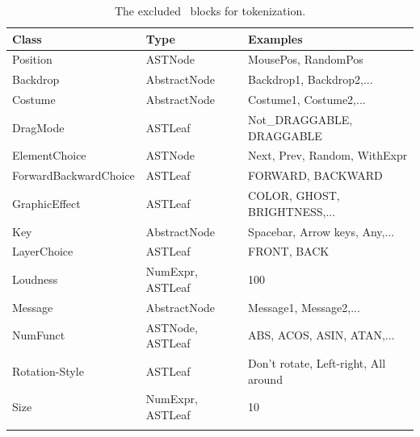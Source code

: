 \begin{table}[H]
    \caption[The excluded \scratch\ blocks]{\label{tab:excluded-blocks}The excluded \scratch\ blocks for tokenization.}

    \begin{tabular}[t]{lll}
    	\toprule
    	Class & Type & Examples \\
    	\midrule
    	\vspace{10pt}
    		Position & ASTNode & MousePos, RandomPos \\
    		\vspace{10pt} 
    		Backdrop & AbstractNode & Backdrop1, Backdrop2,... \\
    		\vspace{10pt} 
    		Costume & AbstractNode & Costume1, Costume2,... \\
    		\vspace{10pt}
    		DragMode & ASTLeaf & Not\_DRAGGABLE, DRAGGABLE \\
    		\vspace{10pt}
   		ElementChoice & ASTNode & Next, Prev, Random, WithExpr \\
   		\vspace{10pt}
    		ForwardBackwardChoice & ASTLeaf & FORWARD, BACKWARD \\
    		\vspace{10pt}
    		GraphicEffect & ASTLeaf & COLOR, GHOST, BRIGHTNESS,... \\
    		\vspace{10pt}
    		Key & AbstractNode & Spacebar, Arrow keys, Any,... \\
    		\vspace{10pt} 
   	 	LayerChoice & ASTLeaf & FRONT, BACK \\ 
   	 	\vspace{10pt}
    		Loudness & NumExpr, ASTLeaf & 100 \\
    		\vspace{10pt}
   		Message & AbstractNode & Message1, Message2,... \\
   		\vspace{10pt}
    		NumFunct & ASTNode, ASTLeaf & ABS, ACOS, ASIN, ATAN,... \\
    		\vspace{10pt} 
   		Rotation-Style & ASTLeaf & Don't rotate, Left-right, All around \\
   		\vspace{10pt}
    		Size & NumExpr, ASTLeaf & 10 \\
    		\vspace{10pt}

\end{tabular}
\end{table}
